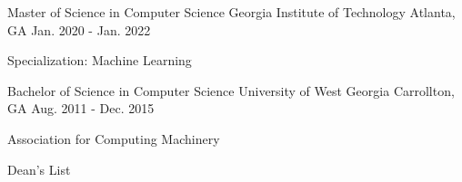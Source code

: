 
\begin{cventries}
  \cventry
    {Master of Science in Computer Science} %
    {Georgia Institute of Technology} %
    {Atlanta, GA} %
    {Jan. 2020 - Jan. 2022} %
    {
      \begin{cvitems} %
         \item {Specialization: Machine Learning}
      \end{cvitems}
    }
    
  \cventry
    {Bachelor of Science in Computer Science} %
    {University of West Georgia} %
    {Carrollton, GA} %
    {Aug. 2011 - Dec. 2015} %
    {
      \begin{cvitems} %
         \item {Association for Computing Machinery}
         \vspace{0.5mm}
         \item {Dean's List}
      \end{cvitems}
    }
\end{cventries}
